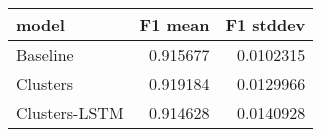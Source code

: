 \begin{tabular}{lrr}
\toprule
 model         &   F1 mean &   F1 stddev \\
\midrule
 Baseline      &  0.915677 &   0.0102315 \\
 Clusters      &  0.919184 &   0.0129966 \\
 Clusters-LSTM &  0.914628 &   0.0140928 \\
\bottomrule
\end{tabular}